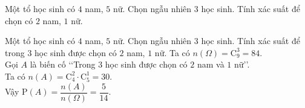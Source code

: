 \begin{bt}%
Một tổ học sinh có $4$ nam, $5$ nữ. Chọn ngẫu nhiên $3$ học sinh. Tính xác suất để chọn có $2$ nam, $1$ nữ.
\end{bt}

\begin{bt}%
	Một tổ học sinh có $4$ nam, $5$ nữ. Chọn ngẫu nhiên $3$ học sinh. Tính xác suất để trong $3$ học sinh được chọn có $2$ nam, $1$ nữ.
	\loigiai
	{
		Ta có $n(\Omega)=\mathrm{C}^3_9=84$.\\
		Gọi $A$ là biến cố \lq\lq Trong $3$ học sinh được chọn có $2$ nam và $1$ nữ\rq\rq. \\
		Ta có $n(A)=\mathrm{C}^2_4\cdot \mathrm{C}^1_5=30$.\\
		Vậy $\mathrm{P}(A)=\dfrac{n(A)}{n(\Omega)}=\dfrac{5}{14}$.
	}
\end{bt}


